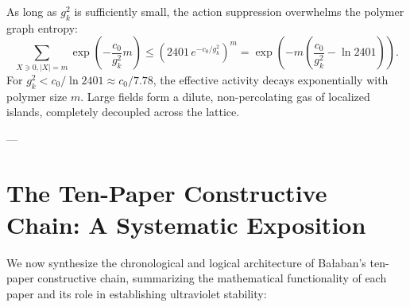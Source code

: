 As long as $g_k^2$ is sufficiently small, the action suppression overwhelms the polymer graph entropy:
\begin{equation}
\label{eq:ch12_polymer_entropy_suppression}
\sum_{X \ni 0, |X| = m} \exp\left( -\frac{c_0}{g_k^2} m \right) \le \left( 2401 \, e^{-c_0 / g_k^2} \right)^m = \exp\left( -m \left( \frac{c_0}{g_k^2} - \ln 2401 \right) \right).
\end{equation}
For $g_k^2 < c_0 / \ln 2401 \approx c_0 / 7.78$, the effective activity decays exponentially with polymer size $m$. Large fields form a dilute, non-percolating gas of localized islands, completely decoupled across the lattice.

---

\section{The Ten-Paper Constructive Chain: A Systematic Exposition}
\label{sec:ten_paper_chain}

We now synthesize the chronological and logical architecture of Ba\l aban's ten-paper constructive chain, summarizing the mathematical functionality of each paper and its role in establishing ultraviolet stability:

